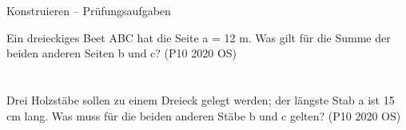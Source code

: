\begin{aufgabe}{Konstruieren – Prüfungsaufgaben}
\begin{teile}
\teil Ein dreieckiges Beet ABC hat die Seite a = 12 m. Was gilt für die Summe der beiden anderen Seiten b und c? \hfill (P10 2020 OS) \\  \\  \\ 
\teil Drei Holzstäbe sollen zu einem Dreieck gelegt werden; der längste Stab a ist 15 cm lang. Was muss für die beiden anderen Stäbe b und c gelten? \hfill (P10 2020 OS) \\  \\  \\ 
\end{teile}
\end{aufgabe}
